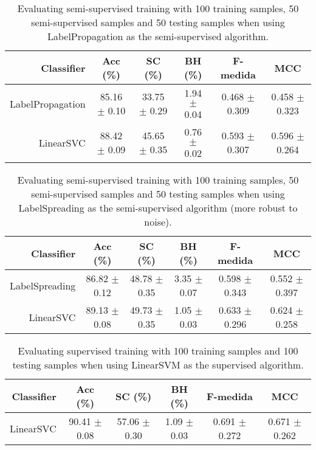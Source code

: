 \begin{table}[!htb]
\footnotesize
\centering
\caption{Evaluating semi-supervised training with 100 training samples, 50 semi-supervised samples and 50 testing samples when using LabelPropagation as the semi-supervised algorithm.}
\label{tab:label-propagation-Avengers_NPoHPNeU9fc}
\begin{tabular}{r|c|c|c|c|c}
\hline\hline
Classifier & Acc (\%) & SC (\%) & BH (\%) & F-medida & MCC \\ \hline
LabelPropagation & 85.16 $\pm$ 0.10 & 33.75 $\pm$ 0.29 & 1.94 $\pm$ 0.04 & 0.468 $\pm$ 0.309 & 0.458 $\pm$ 0.323 \\
LinearSVC & 88.42 $\pm$ 0.09 & 45.65 $\pm$ 0.35 & 0.76 $\pm$ 0.02 & 0.593 $\pm$ 0.307 & 0.596 $\pm$ 0.264 \\
\hline\hline
\end{tabular}
\end{table}
\begin{table}[!htb]
\footnotesize
\centering
\caption{Evaluating semi-supervised training with 100 training samples, 50 semi-supervised samples and 50 testing samples when using LabelSpreading as the semi-supervised algorithm (more robust to noise).}
\label{tab:label-spreading-Avengers_NPoHPNeU9fc}
\begin{tabular}{r|c|c|c|c|c}
\hline\hline
Classifier & Acc (\%) & SC (\%) & BH (\%) & F-medida & MCC \\ \hline
LabelSpreading & 86.82 $\pm$ 0.12 & 48.78 $\pm$ 0.35 & 3.35 $\pm$ 0.07 & 0.598 $\pm$ 0.343 & 0.552 $\pm$ 0.397 \\
LinearSVC & 89.13 $\pm$ 0.08 & 49.73 $\pm$ 0.35 & 1.05 $\pm$ 0.03 & 0.633 $\pm$ 0.296 & 0.624 $\pm$ 0.258 \\
\hline\hline
\end{tabular}
\end{table}
\begin{table}[!htb]
\footnotesize
\centering
\caption{Evaluating supervised training with 100 training samples and 100 testing samples when using LinearSVM as the supervised algorithm.}
\label{tab:linear-svm-Avengers_NPoHPNeU9fc}
\begin{tabular}{r|c|c|c|c|c}
\hline\hline
Classifier & Acc (\%) & SC (\%) & BH (\%) & F-medida & MCC \\ \hline
LinearSVC & 90.41 $\pm$ 0.08 & 57.06 $\pm$ 0.30 & 1.09 $\pm$ 0.03 & 0.691 $\pm$ 0.272 & 0.671 $\pm$ 0.262 \\
\hline\hline
\end{tabular}
\end{table}
